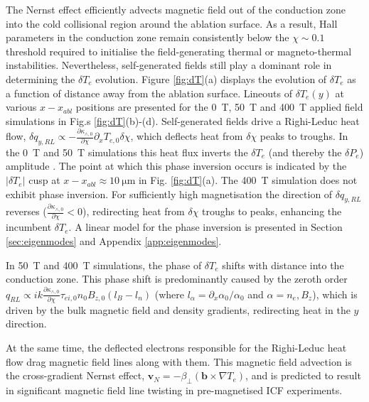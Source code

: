 \documentclass[aip,reprint]{revtex4-1}
\begin{document}
The Nernst effect efficiently advects magnetic field out of the conduction zone into the cold collisional region around the ablation surface.  As a result, Hall parameters in the conduction zone remain consistently below the $ \chi \sim 0.1$  threshold required to initialise the field-generating thermal or magneto-thermal instabilities. Nevertheless, self-generated fields still play a dominant role in determining the $\delta T_e$ evolution.  Figure \ref{fig:dT}(a) displays the evolution of $\delta T_e$ as a function of distance away from the ablation surface. Lineouts of $\delta T_e(y)$ at various $x-x_{abl}$ positions are presented for the \SI{0}{T}, \SI{50}{T} and \SI{400}{T}  applied field simulations in Fig.s \ref{fig:dT}(b)-(d). Self-generated fields drive a Righi-Leduc heat flow, $\delta q_{y,RL} \propto - \frac{\partial \kappa_{\wedge,0}}{\partial \chi} \partial_x T_{e,0} \delta \chi$, which deflects heat from $\delta \chi$ peaks to troughs. In the \SI{0}{T} and \SI{50}{T} simulations this heat flux inverts the $\delta T_e$ (and thereby the $\delta P_e$) amplitude \cite{Hill2018}. The point at which this phase inversion occurs is indicated by the $|\delta T_e|$ cusp at $x-x_{abl} \approx \SI{10}{\micro\meter}$ in Fig. \ref{fig:dT}(a). The \SI{400}{T} simulation does not exhibit phase inversion. For sufficiently high magnetisation  the direction of  $\delta q_{y,RL}$ reverses ($\frac{\partial \kappa_{\wedge,0}}{\partial \chi} <0$), redirecting heat from $\delta \chi$ troughs to peaks, enhancing the incumbent $\delta T_e$. A linear model for the phase inversion is presented in Section \ref{sec:eigenmodes} and Appendix \ref{app:eigenmodes}.   

In \SI{50}{T} and \SI{400}{T} simulations, the phase of $\delta T_e$ shifts with distance into the conduction zone. This phase shift is predominantly caused by the zeroth order $q_{RL} \propto i k \frac{\partial \kappa_{\wedge,0}}{\partial \chi} \tau_{ei,0} n_0 B_{z,0}\left(l_B - l_n \right)$ (where $l_{\alpha} = \partial_x \alpha_0/ \alpha_0$ and  $\alpha = n_{e}, B_z$), which is driven by the bulk magnetic field and density gradients, redirecting heat in the $y$ direction. 

At the same time, the deflected electrons  responsible for the Righi-Leduc heat flow drag magnetic field lines along with them. This magnetic field advection is the cross-gradient Nernst effect, $\mathbf{v}_{N} = - \beta_{\perp} (\mathbf{b}\times \nabla T_e )$, and is predicted to result in significant magnetic field line twisting in pre-magnetised ICF experiments. %
\end{document}
